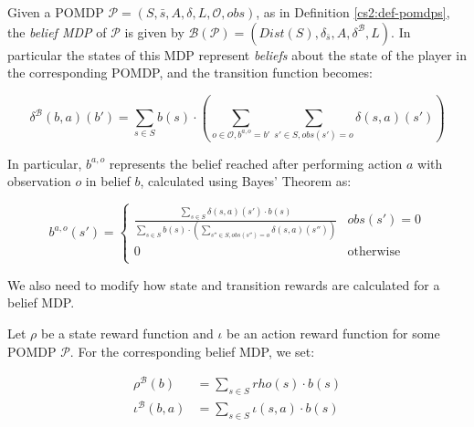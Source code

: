 \begin{definition}
    \label{cs2:belief_mdps}

    Given a POMDP $\mathcal{P} = (S, \bar{s}, A, \delta, L, \mathcal{O}, obs)$, as in Definition \ref{cs2:def-pomdps}, the \emph{belief MDP} of $\mathcal{P}$ is given by $\mathcal{B}(\mathcal{P}) = (Dist(S), \delta_{\bar{s}}, A, \delta^\mathcal{B}, L)$. In particular the states of this MDP represent \emph{beliefs} about the state of the player in the corresponding POMDP, and the transition function becomes:

    \begin{equation*}
        \delta^{\mathcal{B}}(b, a)(b') = \sum_{s \in S} b(s) \cdot \left( \sum_{o \in \mathcal{O}, b^{a,o} = b'} \sum_{s' \in S, obs(s')=o} \delta(s, a)(s')\right)
    \end{equation*}

    In particular, $b^{a, o}$ represents the belief reached after performing action $a$ with observation $o$ in belief $b$, calculated using Bayes' Theorem as:

    \begin{equation*}
        b^{a, o}(s') =
        \begin{cases}
            \frac{\sum_{s \in S}\delta(s, a)(s') \cdot b(s)}{\sum_{s \in S} b(s) \cdot \left(\sum_{s'' \in S, obs(s'')=o} \delta(s,a)(s'')\right)} & obs(s') = 0 \\ 0 & \text{otherwise} \\
        \end{cases}
    \end{equation*}

\end{definition}

We also need to modify how state and transition rewards are calculated for a belief MDP.

\begin{definition}
    \label{cs2:belief_rewards}
    Let $\rho$ be a state reward function and $\iota$ be an action reward function for some POMDP $\mathcal{P}$. For the corresponding belief MDP, we set:

    \begin{align*}
        \rho^{\mathcal{B}}(b) &= \sum_{s \in S} rho(s) \cdot b(s) \\
        \iota^{\mathcal{B}}(b, a) &= \sum_{s \in S} \iota(s, a) \cdot b(s) \\ 
    \end{align*}

\end{definition}

